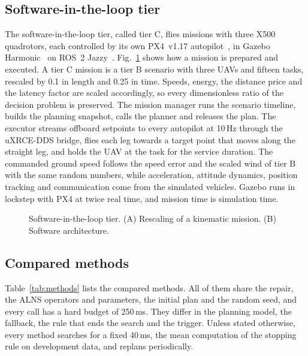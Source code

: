 \subsection{Software-in-the-loop tier}
The software-in-the-loop tier, called tier C, flies missions with three X500 quadrotors, each controlled by its own
PX4~v1.17 autopilot~\cite{meier2015px4}, in Gazebo Harmonic~\cite{koenig2004gazebo} on ROS~2
Jazzy~\cite{macenski2022ros2}. Fig.~\ref{fig:tierc} shows how a mission is prepared and executed. A tier C mission is a
tier B scenario with three UAVs and fifteen tasks, rescaled by 0.1 in length and 0.25 in time. Speeds, energy, the
distance price and the latency factor are scaled accordingly, so every dimensionless ratio of the decision problem is
preserved. The mission manager runs the scenario timeline, builds the planning snapshot, calls the planner and releases
the plan. The executor streams offboard setpoints to every autopilot at 10\,Hz through the uXRCE-DDS bridge, flies
each leg towards a target point that moves along the straight leg, and holds the UAV at the task for the service
duration. The commanded ground speed follows the speed error and the scaled wind of tier B with the same random numbers,
while acceleration, attitude dynamics, position tracking and communication come from the simulated vehicles. Gazebo
runs in lockstep with PX4 at twice real time, and mission time is simulation time.

\begin{figure}[t]
\centering
{}
\caption{Software-in-the-loop tier. (A) Rescaling of a kinematic mission. (B) Software
architecture.}\label{fig:tierc}
\end{figure}

\subsection{Compared methods}\label{sec:methods}
Table~\ref{tab:methods} lists the compared methods. All of them share the repair, the ALNS operators and parameters,
the initial plan and the random seed, and every call has a hard budget of 250\,ms. They differ in the planning model,
the fallback, the rule that ends the search and the trigger. Unless stated otherwise, every method searches for a fixed
40\,ms, the mean computation of the stopping rule on development data, and replans periodically.

